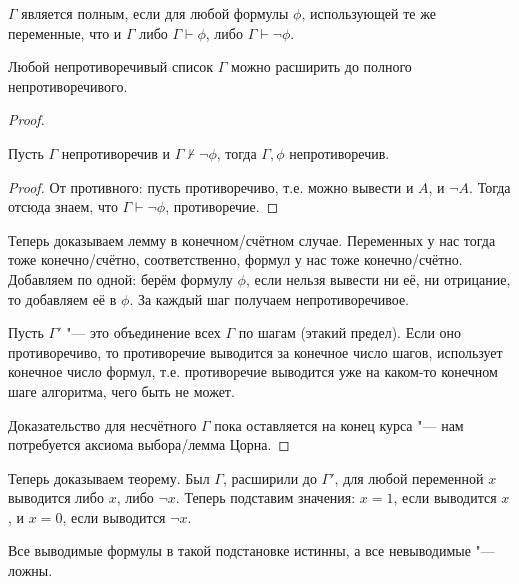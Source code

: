 \begin{Def}
	$\Gamma$ является полным, если для любой формулы $\phi$, использующей те же переменные, что и $\Gamma$
	либо $\Gamma \vdash \phi$, либо $\Gamma \vdash \lnot \phi$.
\end{Def}
\begin{lemma}
	Любой непротиворечивый список $\Gamma$ можно расширить до полного непротиворечивого.
\end{lemma}
\begin{proof}
	\begin{assertion}
		Пусть $\Gamma$ непротиворечив и $\Gamma \not \vdash \lnot \phi$, тогда
		$\Gamma, \phi$ непротиворечив.
	\end{assertion}
	\begin{proof}
		От противного: пусть противоречиво, т.е. можно вывести и $A$, и $\lnot A$.
		Тогда отсюда знаем, что $\Gamma \vdash \lnot \phi$, противоречие.
	\end{proof}
	Теперь доказываем лемму в конечном/счётном случае.
	Переменных у нас тогда тоже конечно/счётно, соответственно, формул у нас тоже конечно/счётно.
	Добавляем по одной: берём формулу $\phi$, если нельзя вывести ни её, ни отрицание, то добавляем её в $\phi$.
	За каждый шаг получаем непротиворечивое.

	Пусть $\Gamma'$ "--- это объединение всех $\Gamma$ по шагам (этакий предел).
	Если оно противоречиво, то противоречие выводится за конечное число шагов, использует конечное число формул,
	т.е. противоречие выводится уже на каком-то конечном шаге алгоритма, чего быть не может.

	Доказательство для несчётного $\Gamma$ пока оставляется на конец курса "--- нам потребуется аксиома выбора/лемма Цорна.
\end{proof}
Теперь доказываем теорему.
Был $\Gamma$, расширили до $\Gamma'$, для любой переменной $x$ выводится либо $x$, либо $\lnot x$.
Теперь подставим значения: $x=1$, если выводится $x$, и $x=0$, если выводится $\lnot x$.
\begin{assertion}
	Все выводимые формулы в такой подстановке истинны, а все невыводимые "--- ложны.
\end{assertion}
